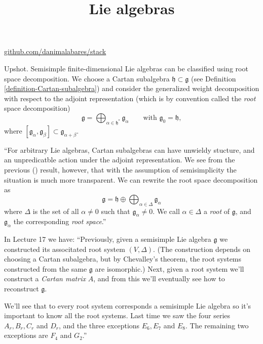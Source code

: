 



\title{Lie algebras}
\maketitle

\label{section-phantom}
\hfill
\href{http://github.com/danimalabares/stack}{github.com/danimalabares/stack}

\tableofcontents

\noindent
Upshot. Semisimple finite-dimensional Lie algebras can
be classified using root space decomposition.
We choose a Cartan subalgebra $\mathfrak{h}\subset\mathfrak{g}$
(see Definition \ref{definition-Cartan-subalgebra})
and consider the generalized weight decomposition with
respect to the adjoint representation
(which is by convention called the {\it root} space decomposition)
$$
\mathfrak{g}=\bigoplus_{\alpha \in \mathfrak{h}^*}\mathfrak{g}_\alpha
\qquad \text{with }\mathfrak{g}_0=\mathfrak{h},
$$
where $[\mathfrak{g}_\alpha,\mathfrak{g}_\beta]
\subset\mathfrak{g}_{\alpha+\beta}$.

``For arbitrary Lie algebras, Cartan subalgebras can
have unwieldy stucture,
and an unpredicatble action under the adjoint representation.
We see from the previous (\cite[Lecture 12]{KLAL}) result,
however, that with the assumption of semisimplicity
the situation is much more transparent.
We can rewrite the root space decomposition as
$$
\mathfrak{g}=\mathfrak{h}\oplus\bigoplus_{\alpha\in\Delta}\mathfrak{g}_\alpha
$$
where $\Delta$ is the set of all $\alpha\neq 0$ such that
$\mathfrak{g}_\alpha\neq 0$.
We call $\alpha \in \Delta$ a {\it root} of $\mathfrak{g}$,
and $\mathfrak{g}_\alpha$ the corresponding {\it root space}.''

In Lecture 17 we have:
``Previously, given a semisimple Lie algebra $\mathfrak{g}$
we constructed its associtated root system $(V,\Delta)$.
(The construction depends on choosing a Cartan subalgebra,
but by Chevalley's theorem,
the root systems constructed from the same $\mathfrak{g}$ 
are isomorphic.) Next, given a root system we'll
construct a {\it Cartan matrix} $A$, and from this we'll
eventually see how to reconstruct $\mathfrak{g}$.

We'll see that to every root system corresponds a semisimple Lie algebra
so it's important to know all the root systems.
Last time we saw the four series $A_r,B_r,C_r$ and $D_r$,
and the three exceptions $E_6,E_7$ and $E_8$.
The remaining two exceptions are $F_4$ and $G_2$.''

